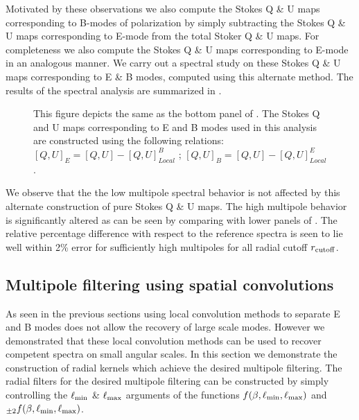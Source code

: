 Motivated by these observations we also compute the Stokes Q \& U maps corresponding to B-modes of polarization by simply subtracting the Stokes Q \& U maps corresponding to E-mode from the total Stoker Q \& U maps. For completeness we also compute the Stokes Q \& U maps corresponding to E-mode in an analogous manner. We carry out a spectral study on these Stokes Q \& U maps corresponding to E \& B modes, computed using this alternate method. The results of the spectral analysis are summarized in .
%
\begin{figure}[!t] 
\centering
\caption{This figure depicts the same as the bottom panel of . The Stokes Q and U maps corresponding to E and B modes used in this analysis are constructed using the following relations:  $[Q,U]_{E}=[Q,U]-[Q,U]_{Local}^B$ ; $[Q,U]_{B}=[Q,U]-[Q,U]_{Local}^{E}$.}
\label{fig:dbqu-spectra_rad_cutoff}
\end{figure}
%
We observe that the the low multipole spectral behavior is not affected by this alternate construction of pure Stokes Q \& U maps. The high multipole behavior is significantly altered as can be seen by comparing  with lower panels of . The relative percentage difference with respect to the reference spectra is seen to lie well within 2\% error for sufficiently high multipoles for all radial cutoff $r_{\rm cutoff}$.
\subsection{Multipole filtering using spatial convolutions}
As seen in the previous sections using local convolution methods to separate E and B modes does not allow the recovery of large scale modes. However we demonstrated that these local convolution methods can be used to recover competent spectra on small angular scales. In this section we demonstrate the construction of radial kernels which achieve the desired multipole filtering. The radial filters for the desired multipole filtering can be constructed by simply controlling the $\ell_{\rm min}$ \& $\ell_{\rm max}$ arguments of the functions $f(\beta,\ell_{\rm min},\ell_{\rm max})$ and ${}_{\pm 2}f(\beta,\ell_{\rm min},\ell_{\rm max})$.

